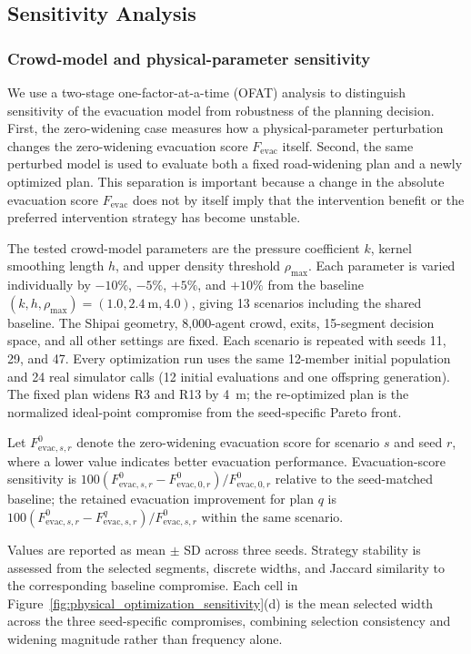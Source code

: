 \documentclass[preprint,12pt]{elsarticle}
\begin{document}
{\color{blue}
\subsection{Sensitivity Analysis}
\label{sec:sensitivity_revised}

\subsubsection{Crowd-model and physical-parameter sensitivity}

We use a two-stage one-factor-at-a-time (OFAT) analysis to distinguish sensitivity of the evacuation model from robustness of the planning decision. First, the zero-widening case measures how a physical-parameter perturbation changes the zero-widening evacuation score $F_{\mathrm{evac}}$ itself. Second, the same perturbed model is used to evaluate both a fixed road-widening plan and a newly optimized plan. This separation is important because a change in the absolute evacuation score $F_{\mathrm{evac}}$ does not by itself imply that the intervention benefit or the preferred intervention strategy has become unstable.

The tested crowd-model parameters are the pressure coefficient $k$, kernel smoothing length $h$, and upper density threshold $\rho_{\max}$. Each parameter is varied individually by $-10\%$, $-5\%$, $+5\%$, and $+10\%$ from the baseline $(k,h,\rho_{\max})=(1.0,2.4~\mathrm{m},4.0)$, giving 13 scenarios including the shared baseline. The Shipai geometry, 8,000-agent crowd, exits, 15-segment decision space, and all other settings are fixed. Each scenario is repeated with seeds 11, 29, and 47. Every optimization run uses the same 12-member initial population and 24 real simulator calls (12 initial evaluations and one offspring generation). The fixed plan widens R3 and R13 by 4~m; the re-optimized plan is the normalized ideal-point compromise from the seed-specific Pareto front.


Let $F_{\mathrm{evac},s,r}^{0}$ denote the zero-widening evacuation
score for scenario $s$ and seed $r$, where a lower value indicates
better evacuation performance. Evacuation-score sensitivity is
$100(F_{\mathrm{evac},s,r}^{0}-F_{\mathrm{evac},0,r}^{0})
/F_{\mathrm{evac},0,r}^{0}$
relative to the seed-matched baseline;
the retained evacuation improvement for plan $q$ is
$100(F_{\mathrm{evac},s,r}^{0}-F_{\mathrm{evac},s,r}^{q})
/F_{\mathrm{evac},s,r}^{0}$
within the same scenario.

Values are reported as mean $\pm$ SD across three seeds. Strategy stability is assessed from the selected segments, discrete widths, and Jaccard similarity to the corresponding baseline compromise. Each cell in Figure~\ref{fig:physical_optimization_sensitivity}(d) is the mean selected width across the three seed-specific compromises, combining selection consistency and widening magnitude rather than frequency alone.

}
\end{document}
